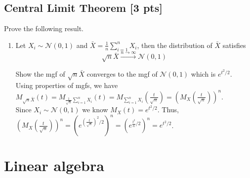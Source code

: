 \documentclass[a4paper]{article}
\theoremstyle{definition}
\newenvironment{soln}{
	\leavevmode\color{blue}\ignorespaces
}{}
\begin{document}
	\subsection{Central Limit Theorem [3 pts]}
	Prove the following result.
	\begin{enumerate}
		\item Let $X_i\sim\mathcal{N}(0, 1)$ and $\bar{X} = \frac{1}{n}\sum_{i=1}^n X_i$, then the distribution of $\bar{X}$ satisfies 
		$$\sqrt{n}\bar{X}\overset{n\rightarrow\infty}{\longrightarrow}\mathcal{N}(0, 1)$$
		
		\begin{soln}
			Show the mgf of $\sqrt{n} \bar{X}$ converges to the mgf of $\mathcal{N}(0, 1)$ which is $e^{t^{2}/2}$.\\
			Using properties of mgfs, we have $M_{\sqrt{n} \bar{X}}(t) = M_{\frac{1}{\sqrt{n}}\sum_{i=1}^n X_i}(t) = M_{\sum_{i=1}^n X_i}(\frac{t}{\sqrt{n}}) = (M_{X}(\frac{t}{\sqrt{n}}))^{n}$.\\
			Since $X_i\sim\mathcal{N}(0, 1)$ we know $M_X(t) = e^{t^{2}/2}$. Thus, $(M_{X}(\frac{t}{\sqrt{n}}))^{n} = (e^{(\frac{t}{\sqrt{n}})^{2}/2})^{n} = (e^{\frac{t^{2}}{n}/2})^{n} = e^{t^{2}/2}$. 
		\end{soln}
		
	\end{enumerate}
	
	
	\section{Linear algebra}
	
\end{document}

